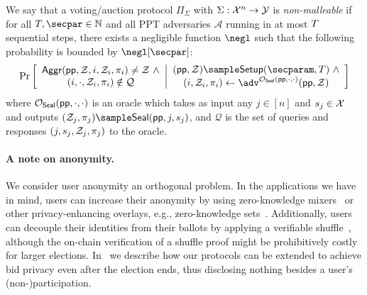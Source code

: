 \begin{definition}\label{def:non_malleability}
We say that a voting/auction protocol $\Pi_\Sigma$ with $\Sigma: \mathcal{X}^n \to \mathcal{Y}$ is \emph{non-malleable} if for all $\Ttime,\secpar \in \mathbb{N}$ and all PPT adversaries $\mathcal{A}$ running in at most $T$ sequential steps, there exists a negligible function $\negl$ such that the following probability is bounded by $\negl[\secpar]$:
\begin{align*}
    \Pr\left[
        \begin{array}{c}
        \Aggr(\pparam, \Z, i, \Z_i, \pi_i) \neq \Z~\land\\
        (i, \cdot, \Z_i, \pi_i) \notin \mathcal{Q}
        \end{array}
        \middle|
        \begin{array}{c}
            (\pparam, \Z) \sample \Setup(\secparam, \Ttime)~\land\\
            (i, \Z_i, \pi_i) \gets \adv^{\mathcal{O}_\Seal(\pparam,\cdot,\cdot)}(\pparam, \Z)
        \end{array}
    \right]
\end{align*}
where $\mathcal{O}_{\mathsf{Seal}}(\mathsf{pp}, \cdot,\cdot)$ is an oracle which takes as input any $j \in [n]$ and $s_j \in \mathcal{X}$ and outputs $(\Z_j, \pi_j) \sample \Seal(\pparam, j, s_j)$, and $\mathcal{Q}$ is the set of queries and responses $(j, s_j, \mathcal{Z}_j, \pi_j)$ to the oracle.
\end{definition}

\paragraph{A note on anonymity.} 
We consider user anonymity an orthogonal problem. In the applications we have in mind, users can increase their anonymity by using zero-knowledge mixers~\cite{PerSemSto19} or other privacy-enhancing overlays, e.g., zero-knowledge sets~\cite{semaphore}. Additionally, users can decouple their identities from their ballots by applying a verifiable shuffle~\cite{CCS:Neff01}, although the on-chain verification of a shuffle proof might be prohibitively costly for larger elections. 
In~ we describe how our protocols can be extended to achieve bid privacy even after the election ends, thus disclosing nothing besides a user's (non-)participation.

